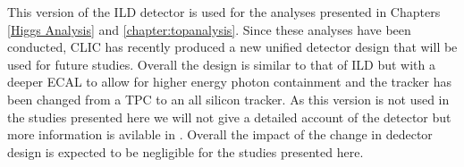 This version of the \ac{ILD} detector is used for the analyses presented in Chapters \ref{Higgs Analysis} and \ref{chapter:topanalysis}. Since these analyses have been conducted, \ac{CLIC} has recently produced a new unified detector design that will be used for future studies. Overall the design is similar to that of \ac{ILD} but with a deeper \ac{ECAL} to allow for higher energy photon containment and the tracker has been changed from a \ac{TPC} to an all silicon tracker. As this version is not used in the studies presented here we will not give a detailed account of the detector but more information is avilable in \cite{Pitters:2018jxt}. Overall the impact of the change in dedector design is expected to be negligible for the studies presented here.






